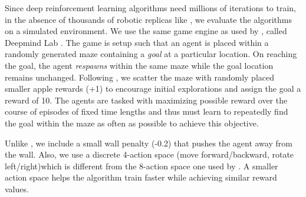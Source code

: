 Since deep reinforcement learning algorithms need millions of iterations to train, in the absence of thousands of robotic replicas like \cite{LePaKrISER2017}, we evaluate the algorithms on a simulated environment.
We use the same game engine as used by \cite{MiPaViICLR2017}, called Deepmind Lab \cite{BeLeTeARXIV2016}.
The game is setup such that an agent is placed within a randomly generated maze containing a \emph{goal} at a particular location.
On reaching the goal, the agent \emph{respawns} within the same maze while the goal location remains unchanged. 
Following \cite{MiPaViICLR2017}, we scatter the maze with randomly placed smaller apple rewards (+1) to encourage initial explorations and assign the goal a reward of 10.
The agents are tasked with maximizing possible reward over the course of episodes of fixed time lengths and thus must learn to repeatedly find the goal within the maze as often as possible to achieve this objective.

Unlike \cite{MiPaViICLR2017}, we include a small wall penalty (-0.2) that pushes the agent away from the wall.
Also, we use a discrete 4-action space (move forward/backward, rotate left/right)which is different from the 8-action space one used by \cite{MiPaViICLR2017}.
A smaller action space helps the algorithm train faster while achieving similar reward values.

